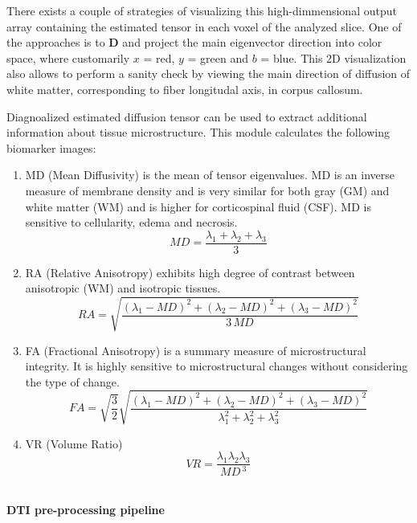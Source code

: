 There exists a couple of strategies of visualizing this high-dimmensional
output array containing the estimated tensor in each voxel of the
analyzed slice. One of the approaches is to $\boldsymbol{D}$ and
project the main eigenvector direction into color space, where customarily
$x$ = red, $y$ = green and $b$ = blue. This 2D visualization also
allows to perform a sanity check by viewing the main direction of
diffusion of white matter, corresponding to fiber longitudal axis,
in corpus callosum.

Diagnoalized estimated diffusion tensor can be used to extract additional
information about tissue microstructure. This module calculates the
following biomarker images: 
\begin{enumerate}
\item MD (Mean Diffusivity) is the mean of tensor eigenvalues. MD is an
inverse measure of membrane density and is very similar for both gray
(GM) and white matter (WM) and is higher for corticospinal fluid (CSF).
MD is sensitive to cellularity, edema and necrosis. 
\begin{equation}
MD=\dfrac{\lambda_{1}+\lambda_{2}+\lambda_{3}}{3}\label{Eq:dti_eq_4}
\end{equation}
\item RA (Relative Anisotropy) exhibits high degree of contrast between
anisotropic (WM) and isotropic tissues. 
\begin{equation}
RA=\sqrt{\dfrac{\left(\lambda_{1}-MD\right)^{2}+\left(\lambda_{2}-MD\right)^{2}+\left(\lambda_{3}-MD\right)^{2}}{3\,MD}}\label{Eq:dti_eq_5}
\end{equation}
\item FA (Fractional Anisotropy) is a summary measure of microstructural
integrity. It is highly sensitive to microstructural changes without
considering the type of change. 
\begin{equation}
FA=\sqrt{\dfrac{3}{2}}\sqrt{\dfrac{\left(\lambda_{1}-MD\right)^{2}+\left(\lambda_{2}-MD\right)^{2}+\left(\lambda_{3}-MD\right)^{2}}{\lambda_{1}^{2}+\lambda_{2}^{2}+\lambda_{3}^{2}}}\label{Eq:dti_eq_6}
\end{equation}
\item VR (Volume Ratio) 
\begin{equation}
VR=\frac{\lambda_{1}\lambda_{2}\lambda_{3}}{MD\,^{3}}\label{Eq:dti_eq_7}
\end{equation}
\end{enumerate}
\hfill{}\\
\textbf{DTI pre-processing pipeline}

